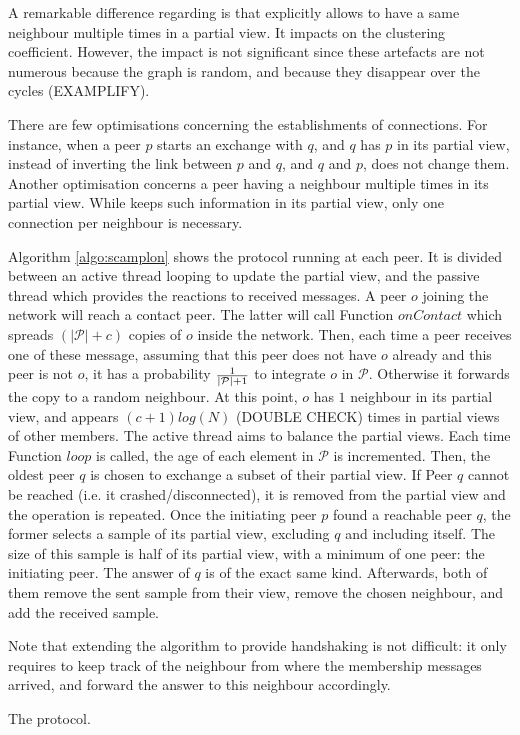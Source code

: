 A remarkable difference regarding \CYCLON{} is that \SCAMPLON{} explicitly
allows to have a same neighbour multiple times in a partial view. It impacts on
the clustering coefficient. However, the impact is not significant since these
artefacts are not numerous because the graph is random, and because they
disappear over the \SCAMPLON{} cycles (EXAMPLIFY).

There are few optimisations concerning the establishments of connections. For
instance, when a peer $p$ starts an exchange with $q$, and $q$ has $p$ in its
partial view, instead of inverting the link between $p$ and $q$, and $q$ and
$p$, \SCAMPLON{} does not change them. Another optimisation concerns a peer
having a neighbour multiple times in its partial view. While \SCAMPLON{} keeps
such information in its partial view, only one connection per neighbour is
necessary.

\begin{asparadesc}
\item [Algorithm]\ref{algo:scamplon} shows the \SCAMPLON{} protocol running at
  each peer. It is divided between an active thread looping to update the
  partial view, and the passive thread which provides the reactions to received
  messages. A peer $o$ joining the network will reach a contact peer. The
  latter will call Function $onContact$ which spreads $(|\mathcal{P}|+c)$
  copies of $o$ inside the network. Then, each time a peer receives one of
  these message, assuming that this peer does not have $o$ already and this
  peer is not $o$, it has a probability $1\over{|\mathcal{P}|+1}$ to integrate
  $o$ in $\mathcal{P}$. Otherwise it forwards the copy to a random neighbour.
  At this point, $o$ has $1$ neighbour in its partial view, and appears
  $(c+1)log(N)$ (DOUBLE CHECK) times in partial views of other members. The
  active thread aims to balance the partial views. Each time Function $loop$ is
  called, the age of each element in $\mathcal{P}$ is incremented. Then, the
  oldest peer $q$ is chosen to exchange a subset of their partial view. If Peer
  $q$ cannot be reached (i.e. it crashed/disconnected), it is removed from the
  partial view and the operation is repeated. Once the initiating peer $p$
  found a reachable peer $q$, the former selects a sample of its partial view,
  excluding $q$ and including itself. The size of this sample is half of its
  partial view, with a minimum of one peer: the initiating peer. The answer of
  $q$ is of the exact same kind. Afterwards, both of them remove the sent
  sample from their view, remove the chosen neighbour, and add the received
  sample.
\end{asparadesc}

Note that extending the algorithm to provide handshaking is not difficult: it
only requires to keep track of the neighbour from where the membership messages
arrived, and forward the answer to this neighbour accordingly.

\begin{algorithm}
  
  \caption{\label{algo:scamplon}The \SCAMPLON{} protocol.}
\end{algorithm}

